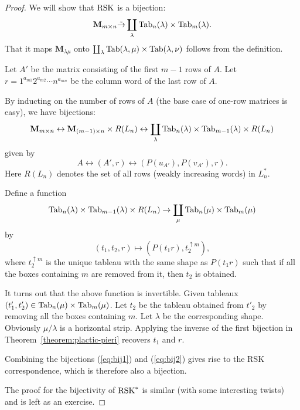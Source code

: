 \documentclass[11pt]{amsproc}
\theoremstyle{definition}
\theoremstyle{example}
\newcommand{\Tab}{\textup{Tab}}
\newcommand{\rsk}{\textup{RSK}}
\begin{document}
\begin{proof}
  We will show that $\rsk$ is a bijection:
  \begin{displaymath}
    \mathbf M_{m\times n} \tilde\to \coprod_\lambda \Tab_n(\lambda)\times \Tab_m(\lambda).
  \end{displaymath}
  That it maps $\mathbf M_{\lambda\mu}$ onto $\coprod_\lambda \Tab(\lambda,\mu)\times \Tab(\lambda,\nu)$ follows from the definition.

  Let $A'$ be the matrix consisting of the first $m-1$ rows of $A$.
  Let $r=1^{a_{m1}}2^{a_{m2}}\dotsb n^{a_{mn}}$ be the column word of the last row of $A$.

  By inducting on the number of rows of $A$ (the base case of one-row matrices is easy), we have bijections:
  \begin{equation}
    \label{eq:bij1}
    \mathbf M_{m\times n} \leftrightarrow \mathbf M_{(m-1)\times n}\times R(L_n) \leftrightarrow \coprod_\lambda \Tab_n(\lambda)\times \Tab_{m-1}(\lambda)\times R(L_n)
  \end{equation}
  given by
  \begin{displaymath}
    A \leftrightarrow (A',r) \leftrightarrow (P(u_{A'}), P(v_{A'}), r).
  \end{displaymath}
  Here $R(L_n)$ denotes the set of all rows (weakly increasing words) in $L_n^*$.

  Define a function
  \begin{equation}
    \label{eq:bij2}
    \Tab_n(\lambda)\times \Tab_{m-1}(\lambda)\times R(L_n) \to \coprod_\mu \Tab_n(\mu)\times \Tab_m(\mu)
  \end{equation}
  by
  \begin{displaymath}
    (t_1, t_2, r)\mapsto (P(t_1r), t_2^{\uparrow m}),
  \end{displaymath}
  where $t_2^{\uparrow m}$ is the unique tableau with the same shape as $P(t_1r)$ such that if all the boxes containing $m$ are removed from it, then $t_2$ is obtained.

  It turns out that the above function is invertible.
  Given tableaux $(t'_1, t'_2)\in \Tab_n(\mu)\times \Tab_m(\mu)$.
  Let $t_2$ be the tableau obtained from $t'_2$ by removing all the boxes containing $m$.
  Let $\lambda$ be the corresponding shape.
  Obviously $\mu/\lambda$ is a horizontal strip.
  Applying the inverse of the first bijection in Theorem~\ref{theorem:plactic-pieri} recovers $t_1$ and $r$.

  Combining the bijections (\ref{eq:bij1}) and (\ref{eq:bij2}) gives rise to the RSK correspondence, which is therefore also a bijection.

  The proof for the bijectivity of $\rsk^*$ is similar (with some interesting twists) and is left as an exercise.
\end{proof}
\end{document}
